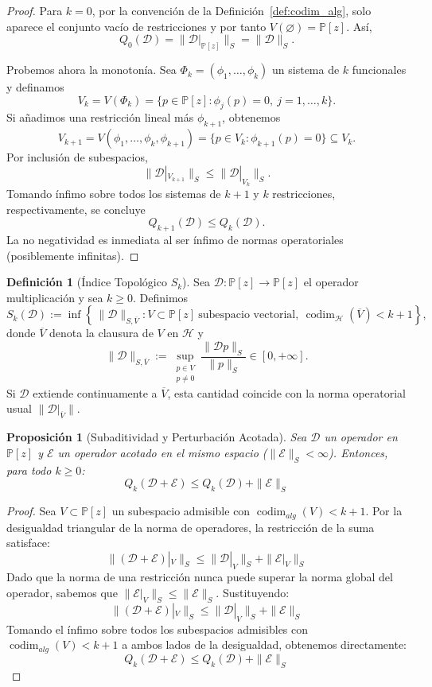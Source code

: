 \documentclass[12pt,a4paper]{article}
\newtheorem{proposition}{Proposición}
\theoremstyle{definition}
\newtheorem{definition}{Definición}
\theoremstyle{remark}
\begin{document}
\begin{proof}
	Para $k=0$, por la convención de la Definición~\ref{def:codim_alg}, solo aparece el conjunto vacío de restricciones y por tanto $V(\varnothing)=\mathbb{P}[z]$. Así,
	$$ Q_0(\mathcal{D}) = \|\mathcal{D}|_{\mathbb{P}[z]}\|_S = \|\mathcal{D}\|_S. $$

	Probemos ahora la monotonía. Sea $\Phi_k=(\phi_1,\dots,\phi_k)$ un sistema de $k$ funcionales y definamos
	$$V_k=V(\Phi_k)=\{p\in\mathbb{P}[z]:\phi_j(p)=0,\ j=1,\dots,k\}.$$
	Si añadimos una restricción lineal más $\phi_{k+1}$, obtenemos
	$$V_{k+1}=V(\phi_1,\dots,\phi_k,\phi_{k+1})=\{p\in V_k:\phi_{k+1}(p)=0\}\subseteq V_k.$$
	Por inclusión de subespacios,
	$$\|\mathcal{D}|_{V_{k+1}}\|_S\le \|\mathcal{D}|_{V_k}\|_S.$$
	Tomando ínfimo sobre todos los sistemas de $k+1$ y $k$ restricciones, respectivamente, se concluye
	$$Q_{k+1}(\mathcal{D})\le Q_k(\mathcal{D}).$$
	La no negatividad es inmediata al ser ínfimo de normas operatoriales (posiblemente infinitas).
\end{proof}

\begin{definition}[Índice Topológico $S_k$]\label{def:indice_Sk}
	Sea $\mathcal{D}:\mathbb{P}[z]\to\mathbb{P}[z]$ el operador multiplicación y sea $k\ge 0$. Definimos
	\[
		S_k(\mathcal{D})
		:=
		\inf\!\left\{\,\|\mathcal{D}\|_{S,\overline{V}}:
		V\subset\mathbb{P}[z]\ \text{subespacio vectorial},\ \operatorname{codim}_{\mathcal{H}}(\overline{V})<k+1\right\},
	\]
	donde $\overline{V}$ denota la clausura de $V$ en $\mathcal{H}$ y
	\[
		\|\mathcal{D}\|_{S,\overline{V}}
		:=
		\sup_{\substack{p\in V\\ p\neq 0}}\frac{\|\mathcal{D}p\|_S}{\|p\|_S}
		\in [0,+\infty].
	\]
	Si $\mathcal{D}$ extiende continuamente a $\overline{V}$, esta cantidad coincide con la norma operatorial usual $\|\mathcal{D}|_{\overline{V}}\|$.
\end{definition}

\begin{proposition}[Subaditividad y Perturbación Acotada]\label{prop:Qk_perturbacion}
	Sea $\mathcal{D}$ un operador en $\mathbb{P}[z]$ y $\mathcal{E}$ un operador acotado en el mismo espacio ($\|\mathcal{E}\|_S < \infty$). Entonces, para todo $k \ge 0$:
	$$ Q_k(\mathcal{D} + \mathcal{E}) \le Q_k(\mathcal{D}) + \|\mathcal{E}\|_S $$
\end{proposition}

\begin{proof}
	Sea $V \subset \mathbb{P}[z]$ un subespacio admisible con $\operatorname{codim}_{alg}(V) < k+1$. Por la desigualdad triangular de la norma de operadores, la restricción de la suma satisface:
	$$ \|(\mathcal{D} + \mathcal{E})|_V\|_S \le \|\mathcal{D}|_V\|_S + \|\mathcal{E}|_V\|_S $$
	Dado que la norma de una restricción nunca puede superar la norma global del operador, sabemos que $\|\mathcal{E}|_V\|_S \le \|\mathcal{E}\|_S$. Sustituyendo:
	$$ \|(\mathcal{D} + \mathcal{E})|_V\|_S \le \|\mathcal{D}|_V\|_S + \|\mathcal{E}\|_S $$
	Tomando el ínfimo sobre todos los subespacios admisibles con $\operatorname{codim}_{alg}(V)<k+1$ a ambos lados de la desigualdad, obtenemos directamente:
	$$ Q_k(\mathcal{D} + \mathcal{E}) \le Q_k(\mathcal{D}) + \|\mathcal{E}\|_S $$
\end{proof}
\end{document}
